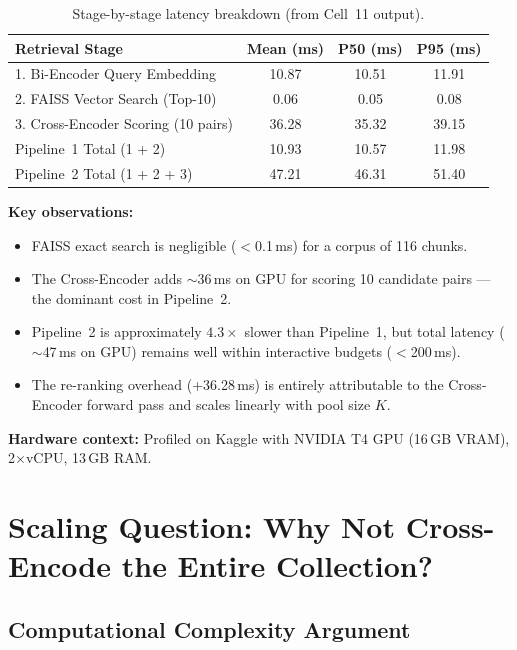 \documentclass[11pt,a4paper]{article}
\begin{document}
\begin{table}[H]
\centering
\caption{Stage-by-stage latency breakdown (from Cell~11 output).}
\label{tab:latency}
\begin{tabular}{@{}lccc@{}}
\toprule
\textbf{Retrieval Stage}
  & \textbf{Mean (ms)}
  & \textbf{P50 (ms)}
  & \textbf{P95 (ms)} \\
\midrule
1. Bi-Encoder Query Embedding      & 10.87 & 10.51 & 11.91 \\
2. FAISS Vector Search (Top-10)    & 0.06  & 0.05  & 0.08  \\
3. Cross-Encoder Scoring (10 pairs)& 36.28 & 35.32 & 39.15 \\
\midrule
Pipeline~1 Total (1 + 2)           & 10.93 & 10.57 & 11.98 \\
Pipeline~2 Total (1 + 2 + 3)       & 47.21 & 46.31 & 51.40 \\
\bottomrule
\end{tabular}
\end{table}

\noindent\textbf{Key observations:}
\begin{itemize}[nosep]
    \item FAISS exact search is negligible ($<$0.1\,ms) for a corpus of
          116 chunks.
    \item The Cross-Encoder adds $\sim$36\,ms on GPU for scoring 10 candidate
          pairs --- the dominant cost in Pipeline~2.
    \item Pipeline~2 is approximately $4.3\times$ slower than Pipeline~1, but
          total latency ($\sim$47\,ms on GPU) remains well within interactive
          budgets ($<$200\,ms).
    \item The re-ranking overhead (+36.28\,ms) is entirely attributable to the
          Cross-Encoder forward pass and scales linearly with pool size $K$.
\end{itemize}

\noindent\textbf{Hardware context:}
Profiled on Kaggle with NVIDIA T4 GPU (16\,GB VRAM), 2$\times$vCPU,
13\,GB RAM.


\section{Scaling Question: Why Not Cross-Encode the Entire Collection?}
\label{sec:scaling}

\subsection{Computational Complexity Argument}
\end{document}
